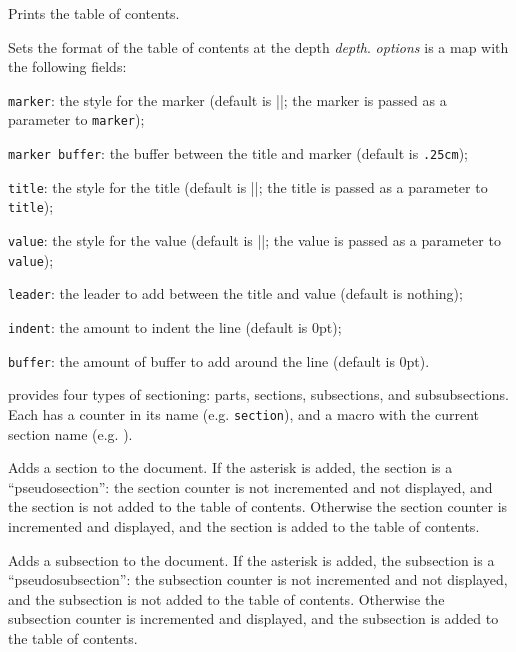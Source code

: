 \macroexp{\tableofcontents}
Prints the table of contents.
\emacroexp

Sets the format of the table of contents at the depth {\it depth}.
{\it options} is a map with the following fields:
\blist
    \item {\tt marker}: the style for the marker (default is \inlinecode||; the marker is passed as a parameter to {\tt marker});
    \item {\tt marker buffer}: the buffer between the title and marker (default is {\tt.25cm});
    \item {\tt title}: the style for the title (default is \inlinecode||; the title is passed as a parameter to {\tt title});
    \item {\tt value}: the style for the value (default is \inlinecode||; the value is passed as a parameter to {\tt value});
    \item {\tt leader}: the leader to add between the title and value (default is nothing);
    \item {\tt indent}: the amount to indent the line (default is 0pt);
    \item {\tt buffer}: the amount of buffer to add around the line (default is 0pt).
\elist
\emacroexp

\pdftoolbox{} provides four types of sectioning: parts, sections, subsections, and subsubsections.
Each has a counter in its name (e.g. {\tt section}), and a macro with the current section name (e.g. \macro\currsection).

Adds a section to the document.
If the asterisk is added, the section is a ``pseudosection'': the section counter is not incremented and not displayed, and the section is not added to the table of contents.
Otherwise the section counter is incremented and displayed, and the section is added to the table of contents.
\emacroexp

Adds a subsection to the document.
If the asterisk is added, the subsection is a ``pseudosubsection'': the subsection counter is not incremented and not displayed, and the subsection is not added to the table of contents.
Otherwise the subsection counter is incremented and displayed, and the subsection is added to the table of contents.
\emacroexp

